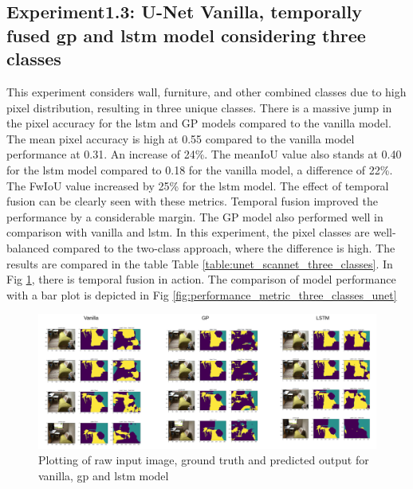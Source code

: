     \subsection{Experiment1.3: U-Net Vanilla, temporally fused gp and lstm model considering three classes}
	
	This experiment considers wall, furniture, and other combined classes due to high pixel distribution, resulting in three unique classes. There is a massive jump in the pixel accuracy for the lstm and GP models compared to the vanilla model. The mean pixel accuracy is high at 0.55 compared to the vanilla model performance at 0.31. An increase of 24\%. The meanIoU value also stands at 0.40 for the lstm model compared to 0.18 for the vanilla model, a difference of 22\%. The FwIoU value increased by 25\% for the lstm model. The effect of temporal fusion can be clearly seen with these metrics. Temporal fusion improved the performance by a considerable margin. The GP model also performed well in comparison with vanilla and lstm. In this experiment, the pixel classes are well-balanced compared to the two-class approach, where the difference is high. The results are compared in the table Table \ref{table:unet_scannet_three_classes}. In Fig \ref{fig:performance_metric_three_classes_scannet}, there is temporal fusion in action. The comparison of model performance with a bar plot is depicted in Fig \ref{fig:performance_metric_three_classes_unet}
	
	\begin{figure}
		\centering
		\includegraphics[width=16cm]{images/unet_scannet_three_classes.png}
		\caption{Plotting of raw input image, ground truth and predicted output for vanilla, gp and lstm model}
		\label{fig:performance_metric_three_classes_scannet}
	\end{figure}

